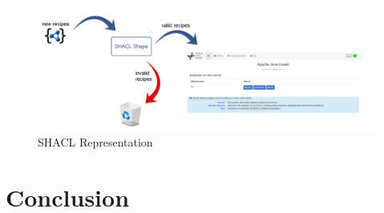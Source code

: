 \documentclass{article}
\begin{document}
\begin{figure}[H]
  \centering
  \includegraphics[width=12cm]{pictures/shacl.png}
  \caption{SHACL Representation}
  \label{fig:shacl}
\end{figure}
\noindent
	
\section{Conclusion}


	
\end{document}
